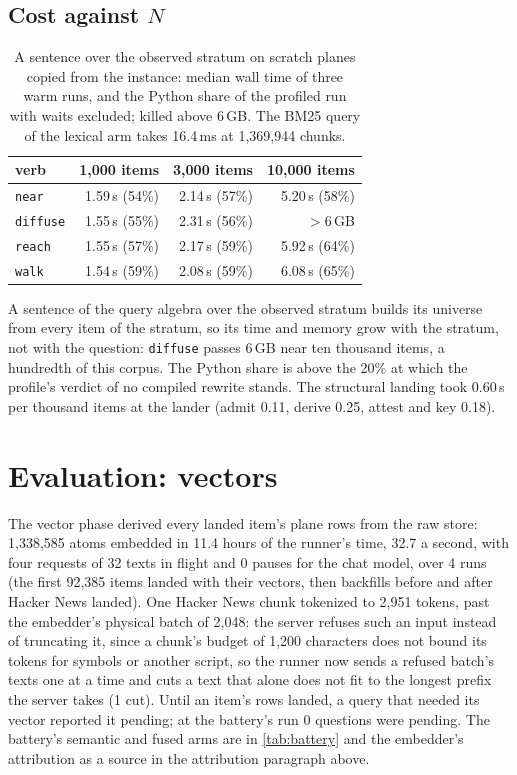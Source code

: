 \documentclass[11pt]{article}
\theoremstyle{plain}
\theoremstyle{definition}
\theoremstyle{remark}
\newcommand{\code}[1]{\texttt{#1}}
\begin{document}
\subsection{Cost against $N$}
\begin{table}[ht]
\centering\small
\begin{tabular}{lrrr}
\toprule
verb & 1,000 items & 3,000 items & 10,000 items\\
\midrule
\code{near} & 1.59\,s (54\%) & 2.14\,s (57\%) & 5.20\,s (58\%)\\
\code{diffuse} & 1.55\,s (55\%) & 2.31\,s (56\%) & $>$6\,GB\\
\code{reach} & 1.55\,s (57\%) & 2.17\,s (59\%) & 5.92\,s (64\%)\\
\code{walk} & 1.54\,s (59\%) & 2.08\,s (59\%) & 6.08\,s (65\%)\\
\bottomrule
\end{tabular}
\caption{A sentence over the observed stratum on scratch planes copied from the instance: median wall time of three warm runs, and the Python share of the profiled run with waits excluded; killed above 6\,GB. The BM25 query of the lexical arm takes 16.4\,ms at 1,369,944 chunks.}
\label{tab:cost}
\end{table}
A sentence of the query algebra over the observed stratum builds its universe from every item of the
stratum, so its time and memory grow with the stratum, not with the question: \code{diffuse} passes
6\,GB near ten thousand items, a hundredth of this corpus. The Python share is above the 20\% at which
the profile's verdict of no compiled rewrite stands. The structural landing took 0.60\,s per thousand
items at the lander (admit 0.11, derive 0.25, attest and key 0.18).

\section{Evaluation: vectors}\label{sec:vectors}
The vector phase derived every landed item's plane rows from the raw store: 1,338,585 atoms embedded in 11.4 hours of the runner's time, 32.7 a second, with four requests of 32 texts in flight and 0 pauses for the chat model, over 4 runs (the first 92,385 items landed with their vectors, then backfills before and after Hacker News landed). One Hacker News chunk tokenized to 2,951 tokens, past the embedder's physical batch of 2,048: the server refuses such an input instead of truncating it, since a chunk's budget of 1,200 characters does not bound its tokens for symbols or another script, so the runner now sends a refused batch's texts one at a time and cuts a text that alone does not fit to the longest prefix the server takes (1 cut). Until an item's rows landed, a query that needed its vector reported it pending; at the battery's run 0 questions were pending. The battery's semantic and fused arms are in \cref{tab:battery} and the embedder's attribution as a source in the attribution paragraph above.
\end{document}

